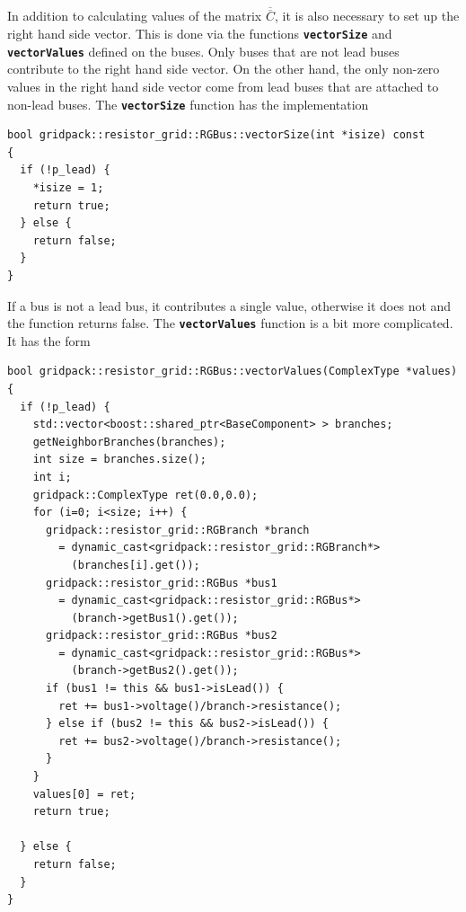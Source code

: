In addition to calculating values of the matrix $\overline{\overline{C}}$, it is also necessary to set up the right hand side vector. This is done via the functions \texttt{\textbf{vectorSize}} and \texttt{\textbf{vectorValues}} defined on the buses. Only buses that are not lead buses contribute to the right hand side vector. On the other hand, the only non-zero values in the right hand side vector come from lead buses that are attached to non-lead buses. The \texttt{\textbf{vectorSize}} function has the implementation

{
\color{red}
\begin{Verbatim}[fontseries=b]
bool gridpack::resistor_grid::RGBus::vectorSize(int *isize) const
{
  if (!p_lead) {
    *isize = 1;
    return true;
  } else {
    return false;
  }
}
\end{Verbatim}
}

If a bus is not a lead bus, it contributes a single value, otherwise it does not and the function returns false. The \texttt{\textbf{vectorValues}} function is a bit more complicated. It has the form

{
\color{red}
\begin{Verbatim}[fontseries=b]
bool gridpack::resistor_grid::RGBus::vectorValues(ComplexType *values)
{
  if (!p_lead) {
    std::vector<boost::shared_ptr<BaseComponent> > branches;
    getNeighborBranches(branches);
    int size = branches.size();
    int i;
    gridpack::ComplexType ret(0.0,0.0);
    for (i=0; i<size; i++) {
      gridpack::resistor_grid::RGBranch *branch
        = dynamic_cast<gridpack::resistor_grid::RGBranch*>
          (branches[i].get());
      gridpack::resistor_grid::RGBus *bus1
        = dynamic_cast<gridpack::resistor_grid::RGBus*>
          (branch->getBus1().get());
      gridpack::resistor_grid::RGBus *bus2
        = dynamic_cast<gridpack::resistor_grid::RGBus*>
          (branch->getBus2().get());
      if (bus1 != this && bus1->isLead()) {
        ret += bus1->voltage()/branch->resistance();
      } else if (bus2 != this && bus2->isLead()) {
        ret += bus2->voltage()/branch->resistance();
      }
    }
    values[0] = ret;
    return true;

  } else {
    return false;
  }
}
\end{Verbatim}
}

